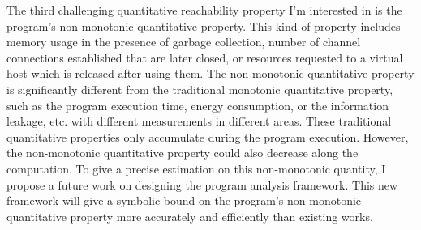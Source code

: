 \begin{abstractpage}
{
 The third challenging quantitative reachability property I'm interested in is the program's {non-monotonic} quantitative property.
 This kind of property includes memory usage in the presence of garbage collection,
number of channel connections established that are later closed,
or resources requested to a virtual host which is released after using them. 
The non-monotonic quantitative property is significantly different from the traditional monotonic quantitative property,
such as the program execution time, energy consumption,
or the information leakage, etc. with different measurements in different areas.
These traditional quantitative properties only accumulate during the program execution. 
However, the non-monotonic quantitative property could also decrease along the computation.
To give a precise estimation on this {non-monotonic} quantity, I propose a future work on designing the program analysis framework.
This new framework will give
a symbolic bound on the program's non-monotonic quantitative property more accurately and efficiently
than existing works.
}
%
\end{abstractpage}
